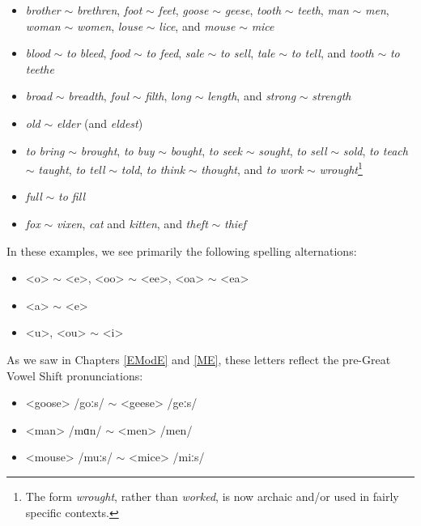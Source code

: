 \begin{itemize}
\item \textit{brother} $\sim$ \textit{brethren}, \textit{foot} $\sim$ \textit{feet}, \textit{goose} $\sim$ \textit{geese}, \textit{tooth} $\sim$ \textit{teeth}, \textit{man} $\sim$ \textit{men}, \textit{woman} $\sim$ \textit{women}, \textit{louse} $\sim$ \textit{lice}, and \textit{mouse} $\sim$ \textit{mice}
\item \textit{blood} $\sim$ \textit{to bleed}, \textit{food} $\sim$ \textit{to feed}, \textit{sale} $\sim$ \textit{to sell}, \textit{tale} $\sim$ \textit{to tell}, and \textit{tooth} $\sim$ \textit{to teethe}
\item \textit{broad} $\sim$ \textit{breadth}, \textit{foul} $\sim$ \textit{filth},  \textit{long} $\sim$ \textit{length}, and \textit{strong} $\sim$ \textit{strength}
\item \textit{old} $\sim$ \textit{elder} (and \textit{eldest})
\item \textit{to bring} $\sim$ \textit{brought}, \textit{to buy} $\sim$ \textit{bought}, \textit{to seek} $\sim$ \textit{sought}, \textit{to sell} $\sim$ \textit{sold}, \textit{to teach} $\sim$ \textit{taught}, \textit{to tell} $\sim$ \textit{told}, \textit{to think} $\sim$ \textit{thought}, and \textit{to work} $\sim$ \textit{wrought}\footnote{The form \textit{wrought}, rather than \textit{worked}, is now archaic and/or used in fairly specific contexts.}
\item \textit{full} $\sim$ \textit{to fill}
\item \textit{fox} $\sim$ \textit{vixen}, \textit{cat} and \textit{kitten}, and \textit{theft} $\sim$ \textit{thief}
\end{itemize}

\noindent In these examples, we see primarily the following spelling alternations:

\begin{itemize}
\item <o> $\sim$ <e>, <oo> $\sim$ <ee>, <oa> $\sim$ <ea>
\item <a> $\sim$ <e>
\item <u>, <ou> $\sim$ <i>
\end{itemize}

\noindent As we saw in Chapters \ref{EModE} and \ref{ME}, these letters reflect the pre-Great Vowel Shift pronunciations:

\begin{itemize}
\item <goose> /goːs/ $\sim$ <geese> /geːs/
\item <man> /mɑn/ $\sim$ <men> /men/
\item <mouse> /muːs/ $\sim$ <mice> /miːs/
\end{itemize}

